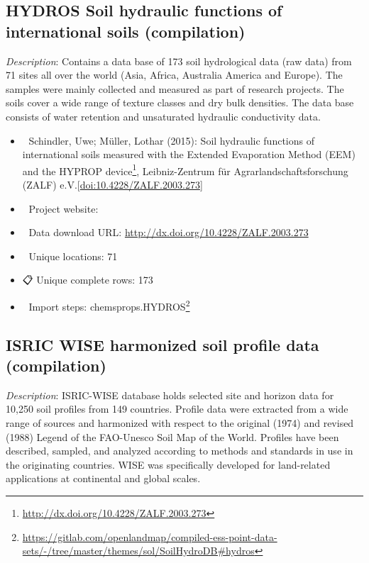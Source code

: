 \documentclass[
  graybox,natbib,nospthms]{svmono}
\providecommand{\tightlist}{%
  \setlength{\itemsep}{0pt}\setlength{\parskip}{0pt}}
\providecommand{\tightlist}{\setlength{\itemsep}{0pt}\setlength{\parskip}{0pt}}
\renewcommand{\href}[2]{#2 (\url{#1})}
\renewcommand{\href}[2]{#2\footnote{\url{#1}}}
\begin{document}
\hypertarget{hydros-soil-hydraulic-functions-of-international-soils-compilation}{%
\subsection{HYDROS Soil hydraulic functions of international soils (compilation)}\label{hydros-soil-hydraulic-functions-of-international-soils-compilation}}

\emph{Description}: Contains a data base of 173 soil hydrological data (raw data) from 71 sites all over the world (Asia, Africa, Australia America and Europe). The samples were mainly collected and measured as part of research projects. The soils cover a wide range of texture classes and dry bulk densities. The data base consists of water retention and unsaturated hydraulic conductivity data.

\begin{itemize}
\tightlist
\item
  📕 Schindler, Uwe; Müller, Lothar (2015): \href{http://dx.doi.org/10.4228/ZALF.2003.273}{Soil hydraulic functions of
  international soils measured with the Extended Evaporation Method (EEM) and the HYPROP device}, Leibniz-Zentrum für Agrarlandschaftsforschung (ZALF) e.V.{[}\url{doi:10.4228/ZALF.2003.273}{]}\\
\item
  🔗 Project website:\\
\item
  📂 Data download URL: \url{http://dx.doi.org/10.4228/ZALF.2003.273}\\
\item
  📍 Unique locations: 71\\
\item
  📋 Unique complete rows: 173\\
\item
  📝 Import steps: \href{https://gitlab.com/openlandmap/compiled-ess-point-data-sets/-/tree/master/themes/sol/SoilHydroDB\#hydros}{chemsprops.HYDROS}
\end{itemize}

\hypertarget{isric-wise-harmonized-soil-profile-data-compilation}{%
\subsection{ISRIC WISE harmonized soil profile data (compilation)}\label{isric-wise-harmonized-soil-profile-data-compilation}}

\emph{Description}: ISRIC-WISE database holds selected site and horizon data for 10,250 soil profiles from 149 countries. Profile data were extracted from a wide range of sources and harmonized with respect to the original (1974) and revised (1988) Legend of the FAO-Unesco Soil Map of the World. Profiles have been described, sampled, and analyzed according to methods and standards in use in the originating countries. WISE was specifically developed for land-related applications at continental and global scales.
\end{document}
